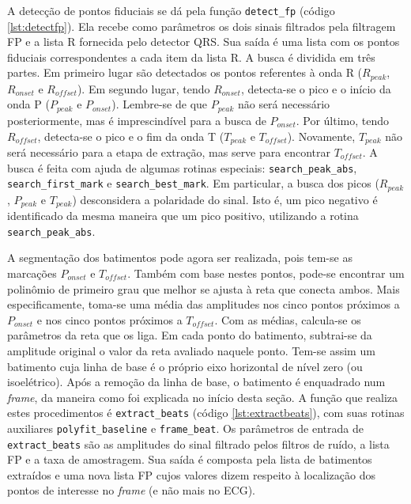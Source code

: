 A detecção de pontos fiduciais se dá pela função \texttt{detect\_fp} (código \ref{lst:detectfp}). Ela recebe como parâmetros os dois sinais filtrados pela filtragem FP e a lista R fornecida pelo detector QRS. Sua saída é uma lista com os pontos fiduciais correspondentes a cada item da lista R. A busca é dividida em três partes. Em primeiro lugar são detectados os pontos referentes à onda R ($R_{peak}$, $R_{onset}$ e $R_{offset}$). Em segundo lugar, tendo $R_{onset}$, detecta-se o pico e o início da onda P ($P_{peak}$ e $P_{onset}$). Lembre-se de que $P_{peak}$ não será necessário posteriormente, mas é imprescindível para a busca de $P_{onset}$. Por último, tendo $R_{offset}$, detecta-se o pico e o fim da onda T ($T_{peak}$ e $T_{offset}$). Novamente, $T_{peak}$ não será necessário para a etapa de extração, mas serve para encontrar $T_{offset}$. A busca é feita com ajuda de algumas rotinas especiais: \texttt{search\_peak\_abs}, \texttt{search\_first\_mark} e \texttt{search\_best\_mark}. Em particular, a busca dos picos ($R_{peak}$, $P_{peak}$ e $T_{peak}$) desconsidera a polaridade do sinal. Isto é, um pico negativo é identificado da mesma maneira que um pico positivo, utilizando a rotina \texttt{search\_peak\_abs}.

A segmentação dos batimentos pode agora ser realizada, pois tem-se as marcações $P_{onset}$ e $T_{offset}$. Também com base nestes pontos, pode-se encontrar um polinômio de primeiro grau que melhor se ajusta à reta que conecta ambos. Mais especificamente, toma-se uma média das amplitudes nos cinco pontos próximos a $P_{onset}$ e nos cinco pontos próximos a $T_{offset}$. Com as médias, calcula-se os parâmetros da reta que os liga. Em cada ponto do batimento, subtrai-se da amplitude original o valor da reta avaliado naquele ponto. Tem-se assim um batimento cuja linha de base é o próprio eixo horizontal de nível zero (ou isoelétrico). Após a remoção da linha de base, o batimento é enquadrado num \emph{frame}, da maneira como foi explicada no início desta seção. A função que realiza estes procedimentos é \texttt{extract\_beats} (código \ref{lst:extractbeats}), com suas rotinas auxiliares \texttt{polyfit\_baseline} e \texttt{frame\_beat}. Os parâmetros de entrada de \texttt{extract\_beats} são as amplitudes do sinal filtrado pelos filtros de ruído, a lista FP e a taxa de amostragem. Sua saída é composta pela lista de batimentos extraídos e uma nova lista FP cujos valores dizem respeito à localização dos pontos de interesse no \emph{frame} (e não mais no ECG).

